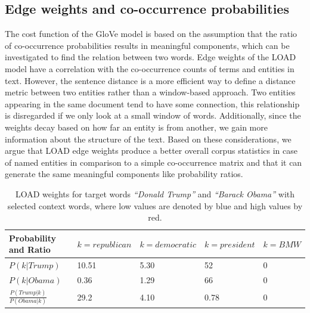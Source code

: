 \subsection{Edge weights and co-occurrence probabilities}\label{subsec:weights_load}
The cost function of the GloVe model is based on the assumption that the ratio of co-occurrence probabilities results in meaningful components, which can be investigated to find the relation between two words. Edge weights of the LOAD model have a correlation with the co-occurrence counts of terms and entities in text. However, the sentence distance is a more efficient way to define a distance metric between two entities rather than a window-based approach. Two entities appearing in the same document tend to have some connection, this relationship is disregarded if we only look at a small window of words. Additionally, since the weights decay based on how far an entity is from another, we gain more information about the structure of the text. Based on these considerations, we argue that LOAD edge weights produce a better overall corpus statistics in case of named entities in comparison to a simple co-occurrence matrix and that it can generate the same meaningful components like probability ratios. \\
\begin{table}[]
\centering

\begin{tabular}{@{}l|l|l|l|l@{}}
\toprule
Probability and Ratio&  $k=republican$& $k=democratic$ & $k=president$ &$k= BMW$  \\ \midrule
 $P(k|Trump)$& {\color[HTML]{CB0000}10.51} &  {\color[HTML]{329A9D}5.30} & {\color[HTML]{CB0000}52} & {\color[HTML]{329A9D}0} \\\midrule
  $P(k|Obama)$&{\color[HTML]{329A9D}0.36}  & {\color[HTML]{CB0000}1.29} &  {\color[HTML]{CB0000}66}&{\color[HTML]{329A9D}0}  \\\midrule
 $\frac { P(Trump|k) }{ P(Obama|k) } $& {\color[HTML]{CB0000}29.2} &  {\color[HTML]{329A9D}4.10}&  0.78 &    0  \\\midrule
\end{tabular}%

\caption{LOAD weights for target words \emph{``Donald Trump''} and \emph{``Barack Obama''} with selected context words, where low values are denoted by blue and high values by red. }
\label{table:tab_2}
\end{table}
\label{sec:components_load}
